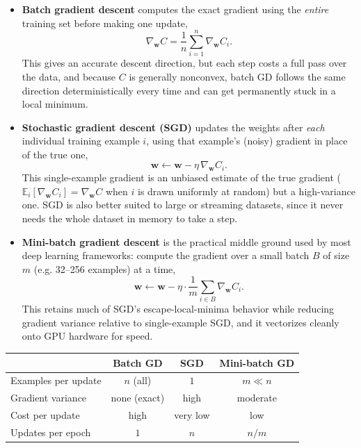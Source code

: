 \documentclass[11pt]{article}
\begin{document}
\begin{itemize}
  \item \textbf{Batch gradient descent} computes the exact gradient using
        the \emph{entire} training set before making one update,
        \[
          \nabla_{\mathbf{w}} C = \frac{1}{n}\sum_{i=1}^{n} \nabla_{\mathbf{w}} C_i.
        \]
        This gives an accurate descent direction, but each step costs a
        full pass over the data, and because $C$ is generally nonconvex,
        batch GD follows the same direction deterministically every time
        and can get permanently stuck in a local minimum.

  \item \textbf{Stochastic gradient descent (SGD)} updates the weights
        after \emph{each} individual training example $i$, using that
        example's (noisy) gradient in place of the true one,
        \[
          \mathbf{w} \gets \mathbf{w} - \eta \, \nabla_{\mathbf{w}} C_i.
        \]
        This single-example gradient is an unbiased estimate of the true
        gradient ($\mathbb{E}_i[\nabla_{\mathbf{w}} C_i] = \nabla_{\mathbf{w}} C$
        when $i$ is drawn uniformly at random) but a high-variance one.
        SGD is also better suited to large or streaming datasets, since it
        never needs the whole dataset in memory to take a step.

  \item \textbf{Mini-batch gradient descent} is the practical middle
        ground used by most deep learning frameworks: compute the
        gradient over a small batch $B$ of size $m$ (e.g. 32--256
        examples) at a time,
        \[
          \mathbf{w} \gets \mathbf{w} - \eta \cdot \frac{1}{m}\sum_{i \in B} \nabla_{\mathbf{w}} C_i.
        \]
        This retains much of SGD's escape-local-minima behavior while
        reducing gradient variance relative to single-example SGD, and it
        vectorizes cleanly onto GPU hardware for speed.
\end{itemize}

\begin{center}
\begin{tabular}{lccc}
  \toprule
  & Batch GD & SGD & Mini-batch GD \\
  \midrule
  Examples per update & $n$ (all) & $1$ & $m \ll n$ \\
  Gradient variance & none (exact) & high & moderate \\
  Cost per update & high & very low & low \\
  Updates per epoch & $1$ & $n$ & $n/m$ \\
  \bottomrule
\end{tabular}
\end{center}
\end{document}
